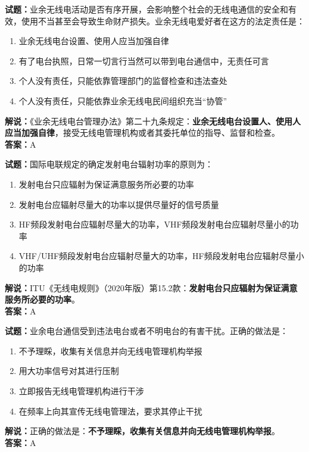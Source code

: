 \documentclass{ctexbook}
\begin{document}
\bigskip


\noindent\textbf{试题：}业余无线电活动是否有序开展，会影响整个社会的无线电通信的安全和有效，使用不当甚至会导致生命财产损失。业余无线电爱好者在这方的法定责任是：
\begin{enumerate}[leftmargin=3em]
	\item 业余无线电台设置、使用人应当加强自律
	\item 有了电台执照，日常一切言行当然可以带到电台通信中，无责任可言
	\item 个人没有责任，只能依靠管理部门的监督检查和违法查处
	\item 个人没有责任，只能依靠业余无线电民间组织充当“协管”
\end{enumerate}
\noindent\textbf{解说：}《业余无线电台管理办法》第二十九条规定：\textbf{业余无线电台设置人、使用人应当加强自律}，接受无线电管理机构或者其委托单位的指导、监督和检查。\\\noindent\textbf{答案：}A



\bigskip


\noindent\textbf{试题：}国际电联规定的确定发射电台辐射功率的原则为：
\begin{enumerate}[leftmargin=3em]
	\item 发射电台只应辐射为保证满意服务所必要的功率
	\item 发射电台应辐射尽量大的功率以提供尽量好的信号质量
	\item HF频段发射电台应辐射尽量大的功率，VHF频段发射电台应辐射尽量小的功率
	\item VHF/UHF频段发射电台应辐射尽量大的功率，HF频段发射电台应辐射尽量小的功率
\end{enumerate}
\noindent\textbf{解说：}ITU《无线电规则》（2020年版）第15.2款：\textbf{发射电台只应辐射为保证满意服务所必要的功率}。\\\noindent\textbf{答案：}A



\bigskip


\noindent\textbf{试题：}业余电台通信受到违法电台或者不明电台的有害干扰。正确的做法是：
\begin{enumerate}[leftmargin=3em]
	\item 不予理睬，收集有关信息并向无线电管理机构举报
	\item 用大功率信号对其进行压制
	\item 立即报告无线电管理机构进行干涉
	\item 在频率上向其宣传无线电管理法，要求其停止干扰
\end{enumerate}
\noindent\textbf{解说：}正确的做法是：\textbf{不予理睬，收集有关信息并向无线电管理机构举报}。\\\noindent\textbf{答案：}A
\end{document}
